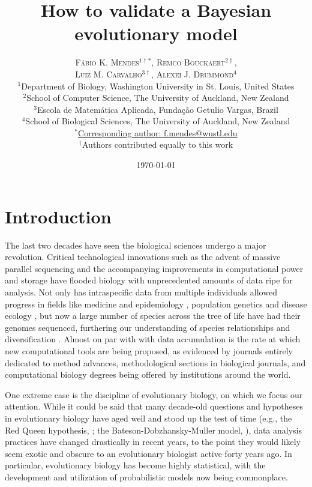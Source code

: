 \documentclass[oneside]{article}
\title{How to validate a Bayesian evolutionary model} %
\author{\textsc{F\'{a}bio K. Mendes$^{1\dagger*}$}, \textsc{Remco Bouckaert$^{2\dagger}$},\\
\textsc{Luiz M. Carvalho$^{3\dagger}$}, \textsc{Alexei J. Drummond$^{4}$} \\
\small $^1$Department of Biology, Washington University in St. Louis, United States\\
\small $^2$School of Computer Science, The University of Auckland, New Zealand\\
\small $^3$Escola de Matem\'{a}tica Aplicada, Fundaç\~{a}o Getulio Vargas, Brazil\\
\small $^4$School of Biological Sciences, The University of Auckland, New Zealand\\
\small
\href{mailto:f.mendes@auckland.ac.nz}{$^*$Corresponding author: f.mendes@wustl.edu}\\
{\small $^\dagger$Authors contributed equally to this work}
}
\date{\today} %
\begin{document}
\maketitle


\section*{Introduction}
The last two decades have seen the biological sciences undergo a major revolution.
Critical technological innovations such as the advent of massive parallel sequencing and the accompanying improvements in computational power and storage have flooded biology with unprecedented amounts of data ripe for analysis.
Not only has intraspecific data from multiple individuals allowed progress in fields like medicine and epidemiology
\citep[e.g.,][]{1000g,humanmicrobiome,neafsey15}, population genetics \citep[e.g.,][]{lynch07,lack16,demanuel16} and disease ecology \citep[e.g.,][]{rosenblum13,bates18}, but now a large number of species across the tree of life have had their genomes sequenced, furthering our understanding of species relationships and diversification \citep[e.g.,][]{pease2016,kawahara19,upham19}.
Almost on par with with data accumulation is the rate at which new computational tools are being proposed, as evidenced by journals entirely dedicated to method advances, methodological sections in biological journals, and computational biology degrees being offered by institutions around the world.

One extreme case is the discipline of evolutionary biology, on which we focus our attention.
While it could be said that many decade-old questions and hypotheses in evolutionary biology have aged well and stood up the test of time (e.g., the Red Queen hypothesis, \citealt{vanvalen73,lively87,morran11,gibson15}; the Bateson-Dobzhansky-Muller model, \citealt{dob36,muller40,hopkins12,roda17}), data analysis practices have changed drastically in recent years, to the point they would likely seem exotic and obscure to an evolutionary biologist active forty years ago. 
In particular, evolutionary biology has become highly statistical, with the development and utilization of probabilistic models now being commonplace.
\end{document}
